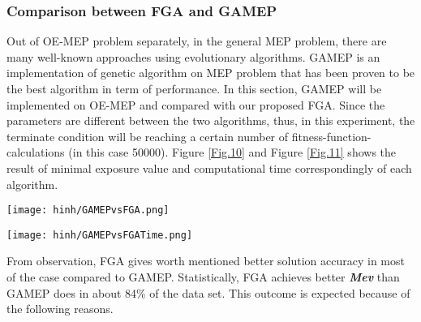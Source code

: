 \documentclass[final]{elsarticle}
\begin{document}
\subsubsection{Comparison between FGA and GAMEP}
Out of OE-MEP problem separately, in the general MEP problem, there are many well-known approaches using evolutionary algorithms. GAMEP \cite{binh2019efficient} is an implementation of genetic algorithm on MEP problem that has been proven to be the best algorithm in term of performance. In this section, GAMEP will be implemented on OE-MEP and compared with our proposed FGA. Since the parameters are different between the two algorithms, thus, in this experiment, the terminate condition will be reaching a certain number of fitness-function-calculations (in this case 50000). Figure \ref{Fig.10} and Figure \ref{Fig.11} shows the result of minimal exposure value and computational time correspondingly of each algorithm.
\begin{figure*}[h]
	\texttt{[image: hinh/GAMEPvsFGA.png]}
	\centering
	\caption{The Minimal Exposure Value comparison between FGA and GAMEP on some noble topologies
	}
	\label{Fig.10}       %
\end{figure*}
\begin{figure*}[h]
	\texttt{[image: hinh/GAMEPvsFGATime.png]}
	\centering
	\caption{The Computational Time (sec) comparison between FGA and GAMEP on some noble topologies
	}
	\label{Fig.11}       %
\end{figure*}
From observation, FGA gives worth mentioned better solution accuracy in most of the case compared to GAMEP. Statistically, FGA achieves better \textit{\textbf{Mev}} than GAMEP does in about 84\% of the data set. This outcome is expected because of  the following reasons.
\end{document}
